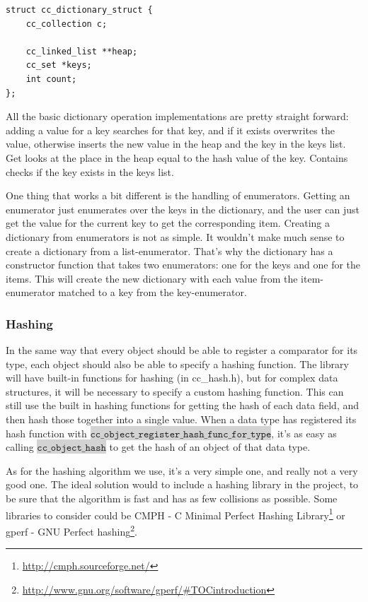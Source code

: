 \documentclass[table]{ituthesis}
\newcommand{\highlight}[1]{\colorbox{lightGray}{$\displaystyle \texttt{#1}$}}
\begin{document}
\begin{lstlisting}[label=cc_dictionary-struct,caption=Internal representation of Dictionary]
struct cc_dictionary_struct {
	cc_collection c;
	
	cc_linked_list **heap;
	cc_set *keys;
	int count;
};
\end{lstlisting}

	All the basic dictionary operation implementations are pretty straight forward: adding a value for a key searches for that key, and if it exists overwrites the value, otherwise inserts the new value in the heap and the key in the keys list. Get looks at the place in the heap equal to the hash value of the key. Contains checks if the key exists in the keys list.

	One thing that works a bit different is the handling of enumerators. Getting an enumerator just enumerates over the keys in the dictionary, and the user can just get the value for the current key to get the corresponding item. Creating a dictionary from enumerators is not as simple. It wouldn't make much sense to create a dictionary from a list-enumerator. That's why the dictionary has a constructor function that takes two enumerators: one for the keys and one for the items. This will create the new dictionary with each value from the item-enumerator matched to a key from the key-enumerator.
	
	\subsubsection{Hashing}
	
	In the same way that every object should be able to register a comparator for its type, each object should also be able to specify a hashing function. The library will have built-in functions for hashing (in cc\_hash.h), but for complex data structures, it will be necessary to specify a custom hashing function. This can still use the built in hashing functions for getting the hash of each data field, and then hash those together into a single value. When a data type has registered its hash function with \highlight{cc\_object\_register\_hash\_func\_for\_type}, it's as easy as calling \highlight{cc\_object\_hash} to get the hash of an object of that data type.
	
	As for the hashing algorithm we use, it's a very simple one, and really not a very good one. The ideal solution would to include a hashing library in the project, to be sure that the algorithm is fast and has as few collisions as possible. Some libraries to consider could be CMPH - C Minimal Perfect Hashing Library\footnote{\url{http://cmph.sourceforge.net/}} or gperf - GNU Perfect hashing\footnote{\url{http://www.gnu.org/software/gperf/\#TOCintroduction}}.
	
\end{document}
